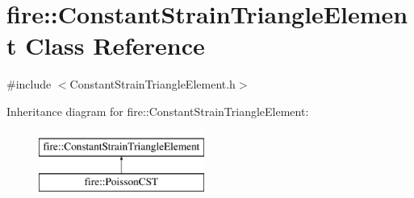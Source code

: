 \hypertarget{a00770}{}\section{fire\+:\+:Constant\+Strain\+Triangle\+Element Class Reference}
\label{a00770}


{\ttfamily \#include $<$Constant\+Strain\+Triangle\+Element.\+h$>$}

Inheritance diagram for fire\+:\+:Constant\+Strain\+Triangle\+Element\+:\begin{figure}[H]
\begin{center}
\leavevmode
\includegraphics[height=2.000000cm]{a00770}
\end{center}
\end{figure}
